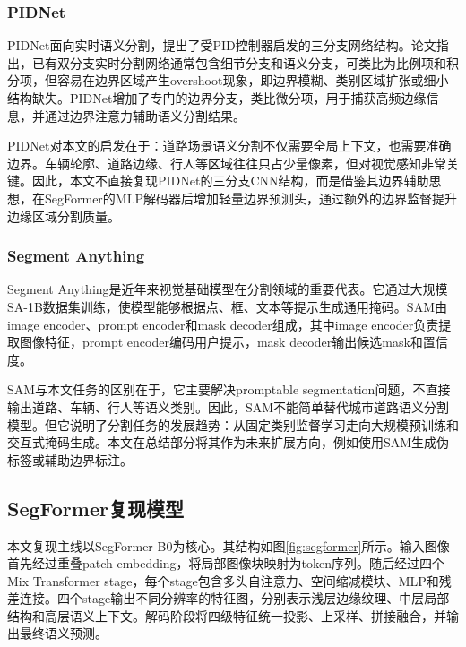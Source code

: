 \documentclass{report}
\begin{document}
\subsubsection{PIDNet}

PIDNet面向实时语义分割，提出了受PID控制器启发的三分支网络结构。论文指出，已有双分支实时分割网络通常包含细节分支和语义分支，可类比为比例项和积分项，但容易在边界区域产生overshoot现象，即边界模糊、类别区域扩张或细小结构缺失。PIDNet增加了专门的边界分支，类比微分项，用于捕获高频边缘信息，并通过边界注意力辅助语义分割结果。

PIDNet对本文的启发在于：道路场景语义分割不仅需要全局上下文，也需要准确边界。车辆轮廓、道路边缘、行人等区域往往只占少量像素，但对视觉感知非常关键。因此，本文不直接复现PIDNet的三分支CNN结构，而是借鉴其边界辅助思想，在SegFormer的MLP解码器后增加轻量边界预测头，通过额外的边界监督提升边缘区域分割质量。

\subsubsection{Segment Anything}

Segment Anything是近年来视觉基础模型在分割领域的重要代表。它通过大规模SA-1B数据集训练，使模型能够根据点、框、文本等提示生成通用掩码。SAM由image encoder、prompt encoder和mask decoder组成，其中image encoder负责提取图像特征，prompt encoder编码用户提示，mask decoder输出候选mask和置信度。

SAM与本文任务的区别在于，它主要解决promptable segmentation问题，不直接输出道路、车辆、行人等语义类别。因此，SAM不能简单替代城市道路语义分割模型。但它说明了分割任务的发展趋势：从固定类别监督学习走向大规模预训练和交互式掩码生成。本文在总结部分将其作为未来扩展方向，例如使用SAM生成伪标签或辅助边界标注。

\subsection{SegFormer复现模型}

本文复现主线以SegFormer-B0为核心。其结构如图\ref{fig:segformer}所示。输入图像首先经过重叠patch embedding，将局部图像块映射为token序列。随后经过四个Mix Transformer stage，每个stage包含多头自注意力、空间缩减模块、MLP和残差连接。四个stage输出不同分辨率的特征图，分别表示浅层边缘纹理、中层局部结构和高层语义上下文。解码阶段将四级特征统一投影、上采样、拼接融合，并输出最终语义预测。
\end{document}
